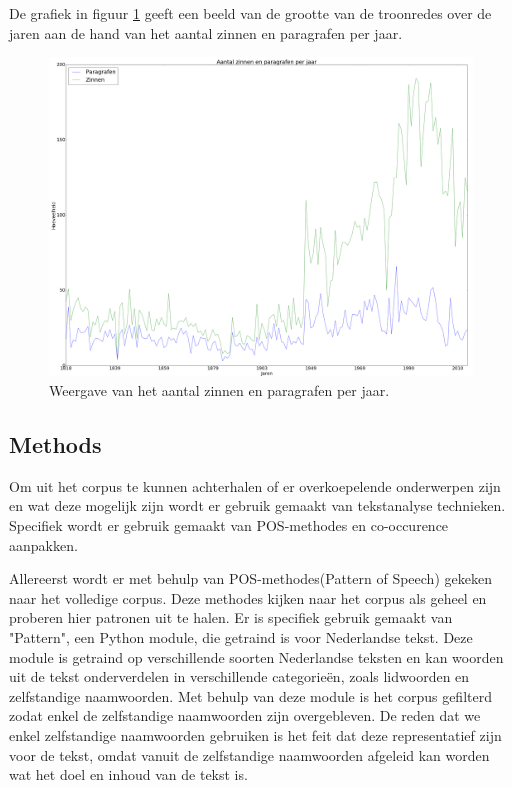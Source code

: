 De grafiek in figuur \ref{inhoud} geeft een beeld van de grootte van de troonredes over de jaren aan de hand van het aantal zinnen en paragrafen per jaar.

\begin{figure}[H]
\begin{center}
\includegraphics[width=1.2\textwidth]{fig/Inhoudverdeling}
\caption{\label{inhoud} Weergave van het aantal zinnen en paragrafen per jaar.}
\end{center}
\end{figure}



\pagebreak
\subsection{Methods}
Om uit het corpus te kunnen achterhalen of er overkoepelende onderwerpen zijn en wat deze mogelijk zijn wordt er gebruik gemaakt van tekstanalyse technieken. Specifiek wordt er gebruik gemaakt van POS-methodes en co-occurence aanpakken.~\cite{callon1991co}  

Allereerst wordt er met behulp van POS-methodes(Pattern of Speech) gekeken naar het volledige corpus. Deze methodes kijken naar het corpus als geheel en proberen hier patronen uit te halen. Er is specifiek gebruik gemaakt van "Pattern", een Python module, die getraind is voor Nederlandse tekst. Deze module is getraind op verschillende soorten Nederlandse teksten en kan woorden uit de tekst onderverdelen in verschillende categorieën, zoals lidwoorden en zelfstandige naamwoorden. Met behulp van deze module is het corpus gefilterd zodat enkel de zelfstandige naamwoorden zijn overgebleven. De reden dat we enkel zelfstandige naamwoorden gebruiken is het feit dat deze representatief zijn voor de tekst, omdat vanuit de zelfstandige naamwoorden afgeleid kan worden wat het doel en inhoud van de tekst is.

